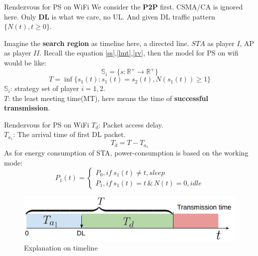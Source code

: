 \documentclass[10pt]{beamer}
\begin{document}
    \begin{frame}{Rendezvous for PS on WiFi}
        We consider the \textbf{P2P} first. CSMA/CA is ignored here. 
        Only \textbf{DL} is what we care, no UL. And given DL traffic pattern $\lbrace N(t), t\geq 0 \rbrace$.  

        Imagine the \textbf{search region} as timeline here, a directed line. 
        $STA$ as player $I$, AP as player $II$. Recall the equation \ref{ss},\ref{lmt},\ref{rv}, then the model for PS on wifi would be like:
        \begin{equation}
            \label{PS_ss}
            \mathbb{S}_i = \lbrace s:\mathbb{R}^+\rightarrow \mathbb{R}^+ \rbrace
        \end{equation}
        \begin{equation}
            \label{PS_lmt}
            T = \inf\lbrace s_1(t): s_1(t) = s_2(t), N(s_1(t)) \geq 1 \rbrace
        \end{equation}
        $\mathbb{S}_i $: strategy set of player $i = 1,2$. \\
        $T$: the least meeting time(MT), here means the time of \textbf{successful transmission}. 
    \end{frame}

    \begin{frame}{Rendezvous for PS on WiFi}
        $T_d$: Packet access delay. \\
        $T_{a_1}$: The arrival time of first DL packet.  
        \begin{equation}
            T_d = T - T_{a_1} 
        \end{equation}
        As for energy consumption of STA, power-consumption is based on the working mode: 
        \begin{equation}
            \label{PowerConsumption}
            P_1(t) =
            \begin{cases}
                P_0, if\ s_1(t)\neq t, sleep\\
                P_1, if\ s_1(t) = t\, \& \, N(t) = 0, idle
            \end{cases}
        \end{equation}
        \begin{figure}[h!]
            \centering
            \includegraphics[scale=0.25]{./figure/RS_timeline.png}
            \caption{Explanation on timeline}
            \label{Timeline}
        \end{figure}
    \end{frame}
\end{document}
